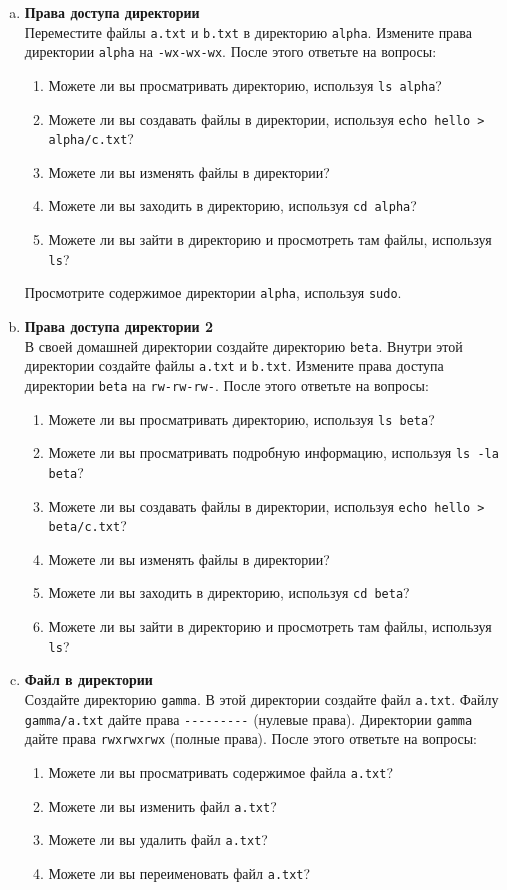 \documentclass{article}
\begin{document}
\begin{enumerate}[a.]
\item \textbf{Права доступа директории}\\
Переместите файлы \texttt{a.txt} и \texttt{b.txt} в директорию \texttt{alpha}. Измените права директории \texttt{alpha} на \texttt{-wx-wx-wx}. После этого ответьте на вопросы:
\begin{enumerate}
\item Можете ли вы просматривать директорию, используя \texttt{ls alpha}?
\item Можете ли вы создавать файлы в директории, используя \texttt{echo hello > alpha/c.txt}?
\item Можете ли вы изменять файлы в директории?
\item Можете ли вы заходить в директорию, используя \texttt{cd alpha}?
\item Можете ли вы зайти в директорию и просмотреть там файлы, используя \texttt{ls}?
\end{enumerate}
Просмотрите содержимое директории \texttt{alpha}, используя \texttt{sudo}.


\item \textbf{Права доступа директории 2}\\
В своей домашней директории создайте директорию \texttt{beta}. Внутри этой директории создайте файлы \texttt{a.txt} и \texttt{b.txt}. Измените права доступа директории \texttt{beta} на \texttt{rw-rw-rw-}. После этого ответьте на вопросы:
\begin{enumerate}
\item Можете ли вы просматривать директорию, используя \texttt{ls beta}?
\item Можете ли вы просматривать подробную информацию, используя \texttt{ls -la beta}?
\item Можете ли вы создавать файлы в директории, используя \texttt{echo hello > beta/c.txt}?
\item Можете ли вы изменять файлы в директории?
\item Можете ли вы заходить в директорию, используя \texttt{cd beta}?
\item Можете ли вы зайти в директорию и просмотреть там файлы, используя \texttt{ls}?
\end{enumerate}


\item \textbf{Файл в директории}\\
Создайте директорию \texttt{gamma}. В этой директории создайте файл \texttt{a.txt}. Файлу \texttt{gamma/a.txt} дайте права \texttt{-{}-{}-{}-{}-{}-{}-{}-{}-} (нулевые права). Директории \texttt{gamma} дайте права \texttt{rwxrwxrwx} (полные права). После этого ответьте на вопросы:
\begin{enumerate}
\item Можете ли вы просматривать содержимое файла \texttt{a.txt}?
\item Можете ли вы изменить файл \texttt{a.txt}?
\item Можете ли вы удалить файл \texttt{a.txt}?
\item Можете ли вы переименовать файл \texttt{a.txt}?
\end{enumerate}


\end{enumerate}
\end{document}
